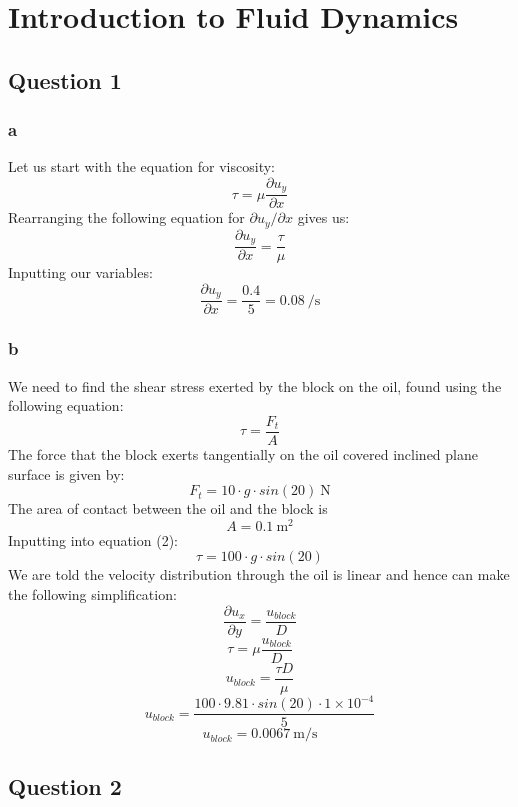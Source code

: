 \section{Introduction to Fluid Dynamics}
\subsection{Question 1}
\subsubsection{a}
Let us start with the equation for viscosity:
\begin{equation}
  \tau = \mu \frac{\partial u_y}{\partial x}
\end{equation}
Rearranging the following equation for \(\partial u_y / \partial x \) gives us:
\[ \frac{\partial u_y}{\partial x} = \frac{\tau}{\mu}\]
Inputting our variables:
\[ \frac{\partial u_y}{\partial x} = \frac{0.4}{5} = 0.08 \ \si{\per\second}\]

\subsubsection{b}
We need to find the shear stress exerted by the block on the oil, found using the following equation:
\begin{equation}
  \tau = \frac{F_t}{A}
\end{equation}
The force that the block exerts tangentially on the oil covered inclined plane surface is given by:
\[ F_t = 10\cdot g \cdot sin(20) \ \si{\newton} \]
The area of contact between the oil and the block is
\[ A = 0.1 \ \si{\meter \squared}\]
Inputting into equation (2):
\[ \tau = 100\cdot g \cdot sin(20) \]
We are told the velocity distribution through the oil is linear and hence can make the following simplification:
\[ \frac{\partial u_x}{\partial y} = \frac{u_{block}}{D} \]
\[ \tau = \mu \frac{u_{block}}{D} \]
\[ u_{block} = \frac{\tau D}{\mu} \]
\[ u_{block} = \frac{100 \cdot 9.81 \cdot sin(20) \cdot 1\times 10^{-4}}{5} \]
\[ u_{block} = 0.0067 \ \si{\meter \per \second} \]
\subsection{Question 2}